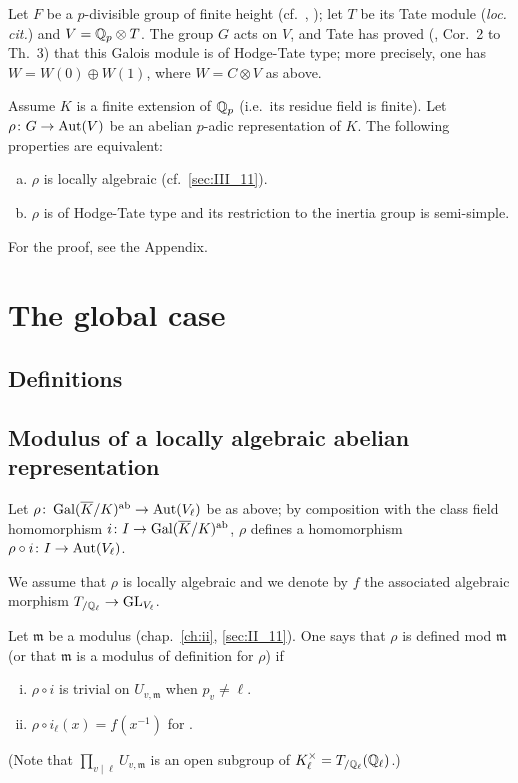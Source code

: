 \begin{ex}
	Let $F$ be a $p$-divisible group of finite height (cf.\ \cite{26},
	\cite{39}); let $T$ be its Tate module (\emph{loc. cit.}) and $V = \mathbb{Q}_p
	\otimes T$. The group $G$ acts on $V$, and Tate has proved (\cite{39},
	Cor.~2 to Th.~3) that this Galois module is of Hodge-Tate type; more
	precisely, one has $W = W(0) \oplus W(1)$, where $W = C \otimes V$ as
	above.
\end{ex}
\begin{thm}[Tate]
Assume $K$ is a finite extension of $\mathbb{Q}_p$ (i.e.\ its residue field is finite).
Let $\rho\colon G \to \operatorname{Aut}(V)$ be an abelian $p$-adic representation of $K$.
The following properties are equivalent:
\begin{enumerate}[(a)]
\item $\rho$ is locally algebraic (cf.\ \ref{sec:III_11}).
\item $\rho$ is of Hodge-Tate type and its restriction to the inertia group is
	semi-simple.
\end{enumerate}
\end{thm}
For the proof, see the Appendix.

\section{The global case}
\subsection{Definitions}
\label{sec:III_21}

\subsection{Modulus of a locally algebraic abelian representation}
\label{sec:III_22}
Let $\rho\colon \operatorname{Gal}(\overline{K}/K)^{\mathrm{ab}} \to \operatorname{Aut}(V_\ell)$ be as above; by
composition with the class field homomorphism $i\colon I \to \operatorname{Gal}(\overline{K}/K)^{\mathrm{ab}}$, $\rho$ defines a homomorphism $\rho \circ i\colon I \to \operatorname{Aut}(V_\ell)$.

We assume that $\rho$ is locally algebraic and we denote by $f$ the associated
\dpage
algebraic morphism $T_{/\mathbb{Q}_\ell} \to \operatorname{GL}_{V_\ell}$.
\begin{mydef}
Let $\mathfrak{m}$ be a modulus (chap.~\ref{ch:ii}, \ref{sec:II_11}).
One says that $\rho$ is defined mod $\mathfrak{m}$ (or that
$\mathfrak{m}$ is a modulus of definition for $\rho$) if
\begin{enumerate}[(i)]
	\item $\rho \circ i$ is trivial on $U_{v, \mathfrak{m}}$ when $p_v \ne
		\ell$.
	\item $\rho \circ i_\ell(x) = f(x^{-1})$ for .
\end{enumerate}
\end{mydef}
(Note that $\prod_{v\mid\ell} U_{v, \mathfrak{m}}$ is an open subgroup of
$K_\ell^\times = T_{/\mathbb{Q}_\ell}(\mathbb{Q}_\ell)$.)

